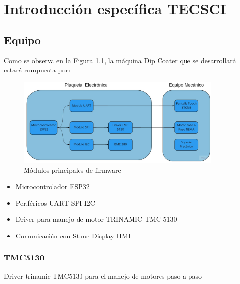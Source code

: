 
\chapter{Introducción específica TECSCI} %

\label{Chapter2} %


\section{Equipo}

Como se observa en la Figura \ref{fig:equipo}, la máquina Dip Coater que se desarrollará estará compuesta por:

\begin{figure}[htpb]
\centering 
\includegraphics[width=0.9\textwidth]{./Figures/equipo.png}
\caption{Módulos principales de firmware}
\label{fig:equipo}
\end{figure}
\vspace{25px}


\begin{itemize}
\item Microcontrolador ESP32 
\item Periféricos UART SPI I2C 
\item Driver para manejo de motor TRINAMIC  TMC 5130
\item Comunicación con Stone Display HMI 
\end{itemize}


\subsection{TMC5130}

Driver trinamic TMC5130 para el manejo de motores paso a paso
